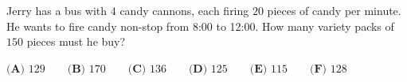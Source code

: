 Jerry has a bus with $4$ candy cannons, each firing $20$ pieces of candy per minute. He wants to fire candy non-stop from 8:00 to 12:00. How many variety packs of $150$ pieces must he buy?

$\textbf{(A) }129\qquad\textbf{(B) }170\qquad\textbf{(C) }136\qquad\textbf{(D) }125\qquad\textbf{(E) }115\qquad\textbf{(F) }128$
